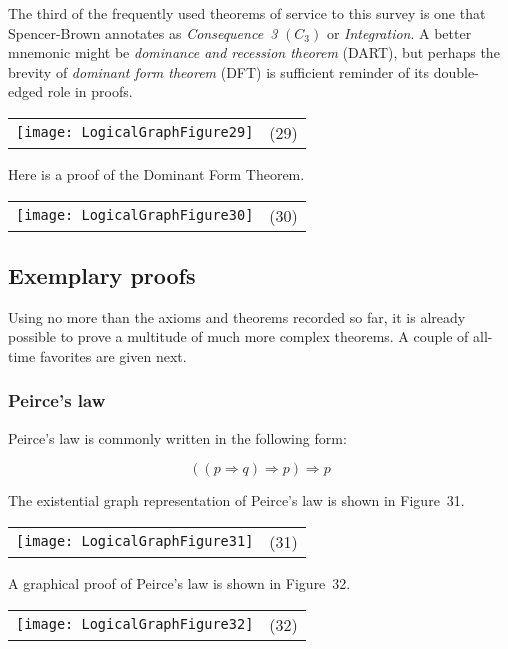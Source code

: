 \documentclass[12pt]{article}
\begin{document}
The third of the frequently used theorems of service to this survey is one that Spencer-Brown annotates as \textit{Consequence~3} $(C_3)$ or \textit{Integration}.  A better mnemonic might be \textit{dominance and recession theorem} (DART), but perhaps the brevity of \textit{dominant form theorem} (DFT) is sufficient reminder of its double-edged role in proofs.

\begin{center}\begin{tabular}{cc}
\texttt{[image: LogicalGraphFigure29]} & (29)
\end{tabular}\end{center}

Here is a proof of the Dominant Form Theorem.

\begin{center}\begin{tabular}{cc}
\texttt{[image: LogicalGraphFigure30]} & (30)
\end{tabular}\end{center}

\subsection{Exemplary proofs}

Using no more than the axioms and theorems recorded so far, it is already possible to prove a multitude of much more complex theorems.  A couple of all-time favorites are given next.

\subsubsection{Peirce's law}

Peirce's law is commonly written in the following form:

\[ ((p \Rightarrow q) \Rightarrow p) \Rightarrow p \]

The existential graph representation of Peirce's law is shown in Figure~31.

\begin{center}\begin{tabular}{cc}
\texttt{[image: LogicalGraphFigure31]} & (31)
\end{tabular}\end{center}

A graphical proof of Peirce's law is shown in Figure~32.

\begin{center}\begin{tabular}{cc}
\texttt{[image: LogicalGraphFigure32]} & (32)
\end{tabular}\end{center}
\end{document}
